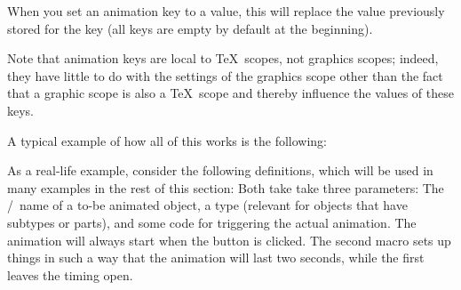 \begin{command}{\pgfsys@animate{}}
\begin{enumerate}
    When you set an animation key to a value, this will replace
    the value previously stored for the key (all keys are empty by
    default at the beginning).
    
    Note that animation keys are local to \TeX\ scopes, not graphics
    scopes; indeed, they have little to do with the settings of the
    graphics scope other than the fact that a graphic scope is also a
    \TeX\ scope and thereby influence the values of these keys.
  \end{enumerate}

  A typical example of how all of this works is the following:
\begin{codeexample}
\pgfsys@animation@repeat@indefinite %
{
  \pgfsys@animation@whom{\someid}{}%
}
{
  \pgfsys@animation@whom{\someid}{}%
  \pgfsys@animation@val@current %
  \pgfsys@animation@val@dimension{5pt} %
}
\end{codeexample}
  As a real-life example, consider the following definitions, which
  will be used in many examples in the rest of this section:
  Both take take three parameters: The \pgfname/\tikzname\ name of a
  to-be animated object, a type (relevant for objects that have
  subtypes or parts), and some code 
  for triggering the actual animation. The animation will always start
  when the button is clicked. The second macro sets up things in such a
  way that the animation will last two seconds, while the first leaves
  the timing open.
\begin{codeexample}
\def\animationtimingexample#1#2#3{ 
  \tikz[fill=blue!25, draw=blue, ultra thick] {
    \pgfidrefnextuse{\objid}{#1}
    \pgfsys@animation@whom{\objid}{#2}
    \pgfidrefnextuse{\nodeid}{node}
    \pgfsys@animation@event{\nodeid}{}{click}{}{begin}
}}
\end{codeexample}
\end{command}
